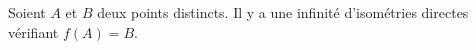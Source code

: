 Soient $A$ et $B$ deux points distincts. Il y a une infinité d'isométries directes vérifiant $f(A)=B$.

\begin{reponses}
\end{reponses}

